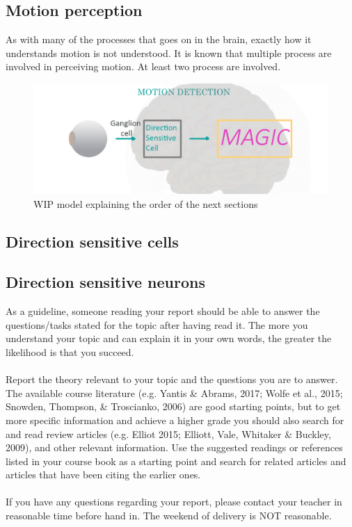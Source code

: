 \documentclass[11pt,a4paper,oneside,table,xcdraw]{article}
\begin{document}
\subsection{Motion perception}
	As with many of the processes that goes on in the brain, exactly how it understands motion is not understood. It is known that multiple process are involved in perceiving motion. At least two process are involved. 
\begin{figure}
	\centering
	\includegraphics[width=0.9\linewidth]{figure/process.png}
	\caption{WIP model explaining the order of the next sections}
	\label{fig:process}
\end{figure}
	\subsection{Direction sensitive cells}
	\subsection{Direction sensitive neurons}
	
	As a guideline, someone reading your report should be able to answer the questions/tasks stated for the topic after having read it. The more you understand your topic and can explain it in your own words, the greater the likelihood is that you succeed.\\\\
	Report the theory relevant to your topic and the questions you are to answer. The available course literature (e.g. Yantis \& Abrams, 2017; Wolfe et al., 2015; Snowden, Thompson, \& Troscianko, 2006) are good starting points, but to get more specific information and achieve a higher grade you should also search for and read review articles (e.g. Elliot 2015; Elliott, Vale, Whitaker \& Buckley, 2009), and other relevant information. Use the suggested readings or references listed in your course book as a starting point and search for related articles and articles that have been citing the earlier ones.\\\\
	If you have any questions regarding your report, please contact your teacher in reasonable time before hand in. The weekend of delivery is NOT reasonable.
\end{document}
